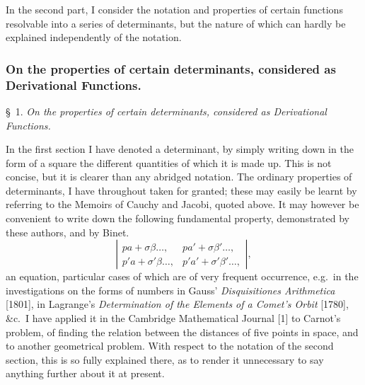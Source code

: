 \documentclass[11pt,a4paper]{book}
\begin{document}
In the second part, I consider the notation and properties of certain functions
resolvable into a series of determinants, but the nature of which can hardly be explained
independently of the notation.

\subsubsection{On the properties of certain determinants, considered as Derivational Functions.}

\textsc{\S\ 1.} \textit{On the properties of certain determinants, considered as Derivational Functions.}

In the first section I have denoted a determinant, by simply writing down in the
form of a square the different quantities of which it is made up. This is not concise,
but it is clearer than any abridged notation. The ordinary properties of determinants,
I have throughout taken for granted; these may easily be learnt by referring to the
Memoirs of Cauchy and Jacobi, quoted above. It may however be convenient to write
down the following fundamental property, demonstrated by these authors, and by Binet.
\[
\left|\begin{array}{cc}
pa + \sigma\beta \ldots, & pa' + \sigma\beta' \ldots, \\
p'a + \sigma'\beta \ldots, & p'a' + \sigma'\beta' \ldots,
\end{array}\right|
\tag{$\Theta$},
\]
an equation, particular cases of which are of very frequent occurrence, e.g.\ in the
investigations on the forms of numbers in Gauss' \textit{Disquisitiones Arithmetica} [1801], in
Lagrange's \textit{Determination of the Elements of a Comet's Orbit} [1780], \&c.\ I have
applied it in the Cambridge Mathematical Journal [1] to Carnot's problem, of finding the relation
between the distances of five points in space, and to another geometrical problem. With
respect to the notation of the second section, this is so fully explained there, as to
render it unnecessary to say anything further about it at present.
\end{document}
